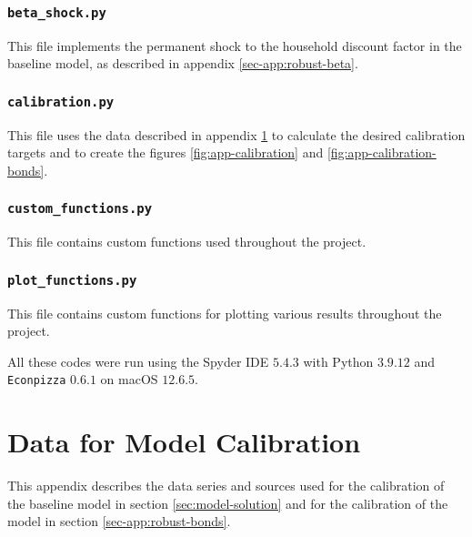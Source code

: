\documentclass[a4paper,12pt]{article} %
\numberwithin{equation}{section} %
\numberwithin{figure}{section}
\numberwithin{table}{section}
\begin{document}
\begin{refsection}
\begin{appendices}
\subsubsection*{\texttt{beta\_shock.py}}

This file implements the permanent shock to the household discount factor in the baseline model, as described in appendix \ref{sec-app:robust-beta}.

\subsubsection*{\texttt{calibration.py}}

This file uses the data described in appendix \ref{sec-app:data} to calculate the desired calibration targets and to create the figures \ref{fig:app-calibration} and \ref{fig:app-calibration-bonds}.

\subsubsection*{\texttt{custom\_functions.py}}

This file contains custom functions used throughout the project.

\subsubsection*{\texttt{plot\_functions.py}}

This file contains custom functions for plotting various results throughout the project.

\bigskip

All these codes were run using the Spyder IDE $5.4.3$ with Python $3.9.12$ and \texttt{Econpizza} $0.6.1$ on macOS $12.6.5$. 

\section{Data for Model Calibration}
\label{sec-app:data}

This appendix describes the data series and sources used for the calibration of the baseline model in section \ref{sec:model-solution} and for the calibration of the model in section \ref{sec-app:robust-bonds}.


\end{appendices}
\end{refsection}
\end{document}
